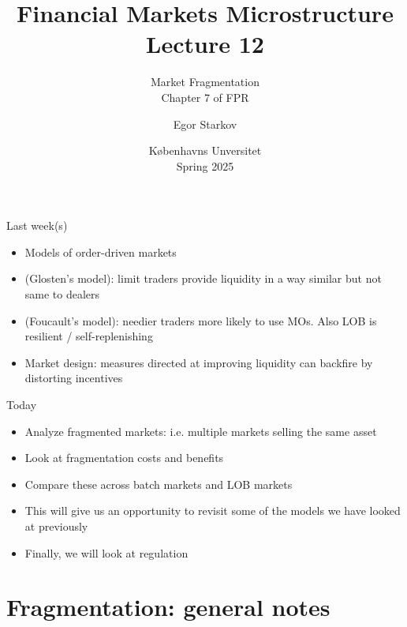 \documentclass[english,10pt
,aspectratio=169
]{beamer}
\title{Financial Markets Microstructure \\ Lecture 12}
\subtitle{Market Fragmentation\\
	Chapter 7 of FPR}
\author{Egor Starkov}
\date{K{\o}benhavns Unversitet \\
	Spring 2025}
\begin{document}
\frame[plain]{\titlepage}


\begin{frame}{Last week(s)}
	\begin{itemize}
		\item Models of order-driven markets
		\item (Glosten's model): limit traders provide liquidity in a way similar but not same to dealers
		\item (Foucault's model): needier traders more likely to use MOs. Also LOB is resilient / self-replenishing
		\item Market design: measures directed at improving liquidity can backfire by distorting incentives
	\end{itemize}
\end{frame}


\begin{frame}{Today}
	\begin{itemize}
		\item Analyze fragmented markets: i.e. multiple markets selling the same asset
		\item Look at fragmentation costs and benefits
		\item Compare these across batch markets and LOB markets
		\item This will give us an opportunity to revisit some of the models we have looked at previously
		\item Finally, we will look at regulation
	\end{itemize}
\end{frame}



\section{Fragmentation: general notes}
\end{document}
